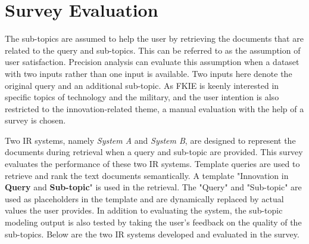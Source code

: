 \section{Survey Evaluation}

The sub-topics are assumed to help the user by retrieving the documents that are related to the query and sub-topics. This can be referred to as the assumption of user satisfaction. Precision analysis can evaluate this assumption when a dataset with two inputs rather than one input is available. Two inputs here denote the original query and an additional sub-topic. As \ac{FKIE} is keenly interested in specific topics of technology and the military, and the user intention is also restricted to the innovation-related theme, a manual evaluation with the help of a survey is chosen.


Two \ac{IR} systems, namely \textit{System A} and \textit{System B}, are designed to represent the documents during retrieval when a query and sub-topic are provided. This survey evaluates the performance of these two \ac{IR} systems. Template queries are used to retrieve and rank the text documents semantically. A template "Innovation in \textbf{Query} and \textbf{Sub-topic}" is used in the retrieval. The "Query" and "Sub-topic" are used as placeholders in the template and are dynamically replaced by actual values the user provides. In addition to evaluating the system, the sub-topic modeling output is also tested by taking the user's feedback on the quality of the sub-topics. Below are the two \ac{IR} systems developed and evaluated in the survey.


